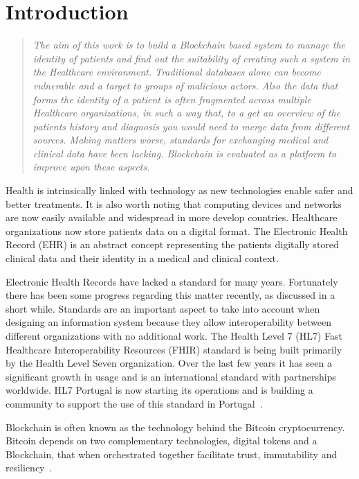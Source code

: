 \chapter{Introduction}
\label{introduction}

\begin{quote} 
  \emph{The aim of this work is to build a Blockchain based system to manage
  the identity of patients and find out the suitability of creating such a
  system in the Healthcare environment.  Traditional databases alone can become
  vulnerable and a target to groups of malicious actors. Also the data that
  forms the identity of a patient is often fragmented across multiple
  Healthcare organizations, in such a way that, to a get an overview of the
  patients history and diagnosis you would need to merge data from different
  sources. Making matters worse, standards for exchanging medical and clinical
  data have been lacking. Blockchain is evaluated as a platform to improve upon
  these aspects.} 
\end{quote}

Health is intrinsically linked with technology as new technologies enable safer
and better treatments. It is also worth noting that computing devices and
networks are now easily available and widespread in more develop countries.
Healthcare organizations now store patients data on a digital format. The
Electronic Health Record (EHR) is an abstract concept representing the patients
digitally stored clinical data and their identity in a medical and clinical
context.

Electronic Health Records  have lacked a standard for many years. Fortunately
there has been some progress regarding this matter recently, as discussed in a
short while.  Standards are an important aspect to take into account when
designing an information system because they allow interoperability between
different organizations with no additional work. The Health Level 7 (HL7) Fast
Healthcare Interoperability Resources (FHIR) standard is being built primarily
by the Health Level Seven organization. Over the last few years it has seen a
significant growth in usage and is an international standard with partnerships
worldwide. HL7 Portugal is now starting its operations and is building a
community to support the use of this standard in Portugal~\cite{HealthLevel7}.

Blockchain is often known as the technology behind the Bitcoin cryptocurrency.
Bitcoin depends on two complementary technologies, digital tokens and a
Blockchain, that when orchestrated together facilitate trust, immutability and
resiliency~\cite{Evans2016}.

